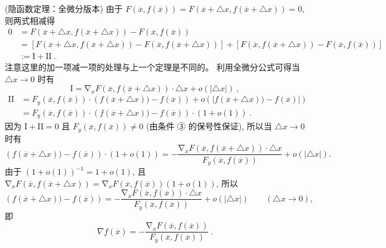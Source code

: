 \begin{theorem}{(隐函数定理：全微分版本)}
由于 $F(\overline{x},f(\overline{x}))=F(\overline{x}+\triangle x,f(\overline{x}+\triangle x))=0$,
则两式相减得
\begin{equation}
\begin{aligned}
0 & = F(\overline{x}+\triangle x,f(\overline{x}+\triangle x))-F(\overline{x},f(\overline{x}))\\
 & = \left[F(\overline{x}+\triangle x,f(\overline{x}+\triangle x))-F(\overline{x},f(\overline{x}+\triangle x))\right]+\left[F(\overline{x},f(\overline{x}+\triangle x))-F(\overline{x},f(\overline{x}))\right]\\
 & := \mathrm{I}+\mathrm{II}~.
\end{aligned}
\end{equation}
注意这里的加一项减一项的处理与上一个定理是不同的。 利用全微分公式可得当 $\triangle x\rightarrow0$ 时有
\[
\mathrm{I}=\mathrm{\nabla}_{x}F(\overline{x},f(\overline{x}+\triangle x))\cdot\triangle x+o(|\triangle x|)~,
\]
\begin{equation}
\begin{aligned}
\mathrm{II} & = F_{y}(\overline{x},f(\overline{x}))\cdot\left(f(\overline{x}+\triangle x))-f(\overline{x})\right)+o\left(|f(\overline{x}+\triangle x))-f(\overline{x})|\right)\\
 & = F_{y}(\overline{x},f(\overline{x}))\cdot\left(f(\overline{x}+\triangle x))-f(\overline{x})\right)\cdot(1+o(1))~.
\end{aligned}
\end{equation}
因为 $\mathrm{I}+\mathrm{II}=0$ 且 $F_{y}(\overline{x},f(\overline{x}))\neq0$
(由条件 ③ 的保号性保证), 所以当 $\triangle x\rightarrow0$ 时有
$$
\left(f(\overline{x}+\triangle x))-f(\overline{x})\right)\cdot(1+o(1))={\displaystyle -\frac{\mathrm{\nabla}_{x}F(\overline{x},f(\overline{x}+\triangle x))\cdot\triangle x}{F_{y}(\overline{x},f(\overline{x}))}+o(|\triangle x|).}~
$$
由于 $(1+o(1))^{-1}=1+o(1)$, 且 $\mathrm{\nabla}_{x}F(\overline{x},f(\overline{x}+\triangle x))=\mathrm{\nabla}_{x}F(\overline{x},f(\overline{x}))(1+o(1))$,
所以
$$
\left(f(\overline{x}+\triangle x))-f(\overline{x})\right)={\displaystyle -\frac{\mathrm{\nabla}_{x}F(\overline{x},f(\overline{x}))\cdot\triangle x}{F_{y}(\overline{x},f(\overline{x}))}+o(|\triangle x|)\quad\quad(\triangle x\rightarrow0),}~
$$
即 
$$
\nabla f(\overline{x})=-\frac{\mathrm{\nabla}_{x}F(\overline{x},f(\overline{x}))}{F_{y}(\overline{x},f(\overline{x}))}~.
$$
\end{theorem}
